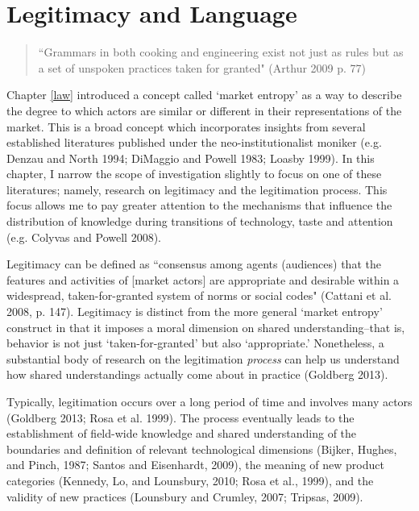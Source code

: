 \chapter{Legitimacy and Language\label{lang}}

\begin{small}
\begin{quote}
``Grammars in both cooking and engineering exist not just as rules but as a set of unspoken practices taken for granted" (Arthur 2009 p. 77)
\end{quote}
\end{small}
Chapter \ref{law} introduced a concept called `market entropy' as a way to describe the degree to which actors are similar or different in their representations of the market. This is a broad concept which incorporates insights from several established literatures published under the neo-institutionalist moniker (e.g. Denzau and North 1994; DiMaggio and Powell 1983; Loasby 1999). In this chapter, I narrow the scope of investigation slightly to focus on one of these literatures; namely, research on legitimacy and the legitimation process. This focus allows me to pay greater attention to the mechanisms that influence the distribution of knowledge during transitions of technology, taste and attention (e.g. Colyvas and Powell 2008).

Legitimacy can be defined as ``consensus among agents (audiences) that the features and activities of [market actors] are appropriate and desirable within a widespread, taken-for-granted system of norms or social codes" (Cattani et al. 2008, p. 147). Legitimacy is distinct from the more general `market entropy' construct in that it imposes a moral dimension on shared understanding--that is, behavior is not just `taken-for-granted' but also `appropriate.' Nonetheless, a substantial body of research on the legitimation \emph{process} can help us understand how shared understandings actually come about in practice (Goldberg 2013).

Typically, legitimation occurs over a long period of time and involves many actors (Goldberg 2013; Rosa et al. 1999). The process eventually leads to the establishment of field-wide knowledge and shared understanding of the boundaries and definition of relevant technological dimensions (Bijker, Hughes, and Pinch, 1987; Santos and Eisenhardt, 2009), the meaning of new product categories (Kennedy, Lo, and Lounsbury, 2010; Rosa et al., 1999), and the validity of new practices (Lounsbury and Crumley, 2007; Tripsas, 2009). 


